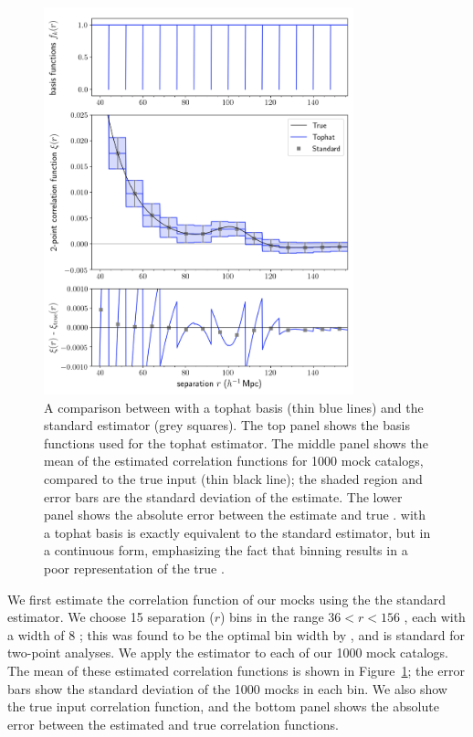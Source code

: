 \begin{figure}[ht]
    \centering
    \includegraphics[width=0.8\textwidth]{xicomparison_2e-4_tophat8_theory8}
    \caption{A comparison between \est with a tophat basis (thin blue lines) and the standard estimator (grey squares). The top panel shows the basis functions used for the tophat estimator. The middle panel shows the mean of the estimated correlation functions for 1000 mock catalogs, compared to the true input \cf (thin black line); the shaded region and error bars are the standard deviation of the \cf estimate. The lower panel shows the absolute error between the estimate and true \cf. \Est with a tophat basis is exactly equivalent to the standard estimator, but in a continuous form, emphasizing the fact that binning results in a poor representation of the true \cf.}
    \label{fig:tophat}
\end{figure}
    
We first estimate the correlation function of our mocks using the the standard estimator.
We choose 15 separation ($r$) bins in the range $36 < r < 156$ \hmpc, each with a width of 8 \hmpc; this was found to be the optimal bin width by \cite{Percival2014}, and is standard for two-point analyses.
We apply the estimator to each of our 1000 mock catalogs.
The mean of these estimated correlation functions is shown in Figure~\ref{fig:tophat}; the error bars show the standard deviation of the 1000 mocks in each bin.
We also show the true input correlation function, and the bottom panel shows the absolute error between the estimated and true correlation functions.

